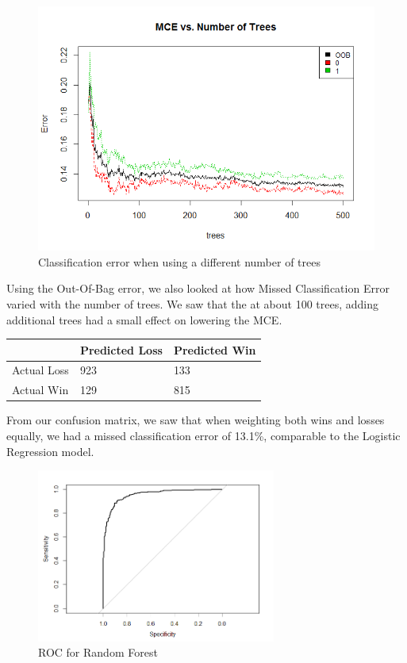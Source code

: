 \documentclass[runningheads]{llncs}
\begin{document}
	\begin{figure}[!htb]
		\centering
		\includegraphics[width=\textwidth]{images/rf_mce.png}
		\caption{Classification error when using a different number of trees}
	\end{figure}
	
	Using the Out-Of-Bag error, we also looked at how Missed Classification Error varied with the number of trees. We saw that the at about 100 trees, adding additional trees had a small effect on lowering the MCE.
	
	\begin{center}
		\begin{tabular}{ | L{3cm} | C{2cm} | C{2cm} | }
			\hline
			& Predicted Loss & Predicted Win \\ \hline
			Actual Loss & 923 & 133 \\ \hline
			Actual Win & 129 & 815 \\ \hline
		\end{tabular}
	\end{center}	
	
	From our confusion matrix, we saw that when weighting both wins and losses equally, we had a missed classification error of 13.1\%, comparable to the Logistic Regression model.
	
	\begin{figure}[!htb]
		\centering
		\includegraphics[width=0.7\textwidth]{images/rf_roc.png}
		\caption{ROC for Random Forest}
	\end{figure}
		
\end{document}

